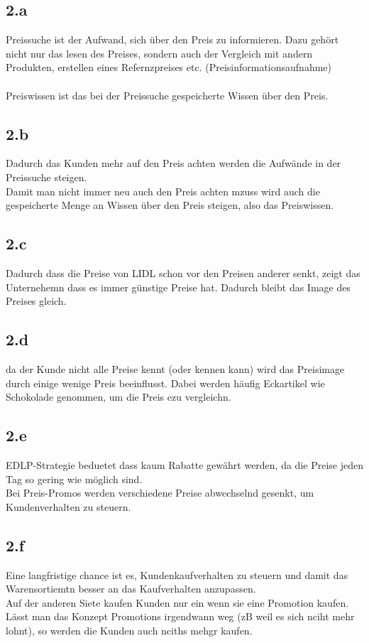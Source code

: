 \subsection{2.a}
    Preissuche ist der Aufwand, sich über den Preis zu informieren. Dazu gehört nicht nur das lesen des Preises, sondern auch der Vergleich mit andern Produkten, erstellen eines Refernzpreises etc. (Preisinformationsaufnahme)\\
    \ \\
    Preiswissen ist das bei der Preissuche gespeicherte Wissen über den Preis. \\

\subsection{2.b}
    Dadurch das Kunden mehr auf den Preis achten werden die Aufwände in der Preissuche steigen. \\
    Damit man nicht immer neu auch den Preis achten mzuss wird auch die gespeicherte Menge an Wissen über den Preis steigen, also das Preiswissen.

\subsection{2.c}
    Dadurch dass die Preise von LIDL schon vor den Preisen anderer senkt, zeigt das Unternehemn dass es immer günstige Preise hat. Dadurch bleibt das Image des Preises gleich.
    
\subsection{2.d}
    da der Kunde nicht alle Preise kennt (oder kennen kann) wird das Preisimage durch einige wenige Preis beeinflusst. Dabei werden häufig Eckartikel wie Schokolade genommen, um die Preis ezu vergleichn.

\subsection{2.e}
    EDLP-Strategie beduetet dass kaum Rabatte gewährt werden, da die Preise jeden Tag so gering wie möglich sind. \\
    Bei Preis-Promos werden verschiedene Preise abwechselnd gesenkt, um Kundenverhalten zu steuern.

\subsection{2.f}
    Eine langfristige chance ist es, Kundenkaufverhalten zu steuern und damit das Warensortiemtn besser an das Kaufverhalten anzupassen. \\
    Auf der anderen Siete kaufen Kunden nur ein wenn sie eine Promotion kaufen. Lässt man das Konzept Promotions irgendwann weg (zB weil es sich nciht mehr lohnt), so werden die Kunden auch nciths mehgr kaufen.

